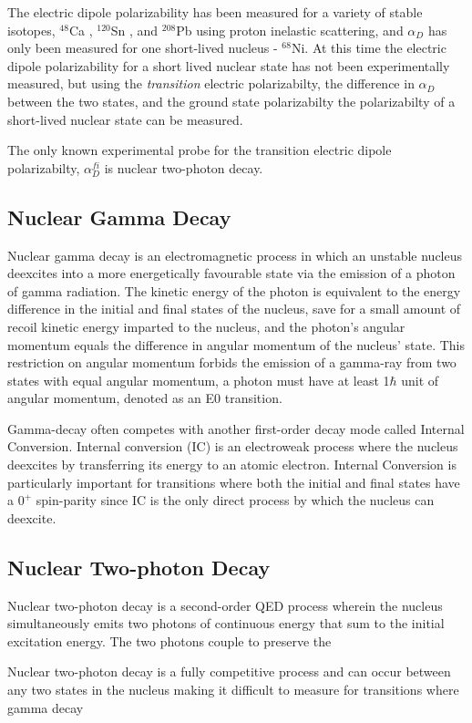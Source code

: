 \documentclass[cnatzke_thesis_proposal.tex]{subfiles}
\begin{document}
The electric dipole polarizability has been measured for a variety of stable isotopes, $^{48}$Ca \cite{Birkhan2017}, $^{120}$Sn \cite{Hashimoto2015}, and $^{208}$Pb \cite{Tamii2011} using proton inelastic scattering, and $\alpha_D$ has only been measured for one short-lived nucleus - $^{68}$Ni. \cite{Rossi2013}
At this time the electric dipole polarizability for a short lived nuclear state has not been experimentally measured, but using the \textit{transition} electric polarizabilty, the difference in $\alpha_D$ between the two states, and the ground state polarizabilty the polarizabilty of a short-lived nuclear state can be measured.

The only known experimental probe for the transition electric dipole polarizabilty, $\alpha_D^{fi}$ is nuclear two-photon decay.

\subsection{Nuclear Gamma Decay}
Nuclear gamma decay is an electromagnetic process in which an unstable nucleus deexcites into a more energetically favourable state via the emission of a photon of gamma radiation. The kinetic energy of the photon is equivalent to the energy difference in the initial and final states of the nucleus, save for a small amount of recoil kinetic energy imparted to the nucleus, and the photon's angular momentum equals the difference in angular momentum of the nucleus' state. This restriction on angular momentum forbids the emission of a gamma-ray from two states with equal angular momentum, a photon must have at least 1$\hbar$ unit of angular momentum, denoted as an E0 transition.

Gamma-decay often competes with another first-order decay mode called Internal Conversion. Internal conversion (IC) is an electroweak process where the nucleus deexcites by transferring its energy to an atomic electron. Internal Conversion is particularly important for transitions where both the initial and final states have a $0^+$ spin-parity since IC is the only direct process by which the nucleus can deexcite. \cite{Krane1988}

\subsection{Nuclear Two-photon Decay}

Nuclear two-photon decay is a second-order QED process wherein the nucleus simultaneously emits two photons of continuous energy that sum to the initial excitation energy. \cite{Kramp1987} 
The two photons couple to preserve the 

Nuclear two-photon decay is a fully competitive process and can occur between any two states in the nucleus making it difficult to measure for transitions where gamma decay 

\end{document}
